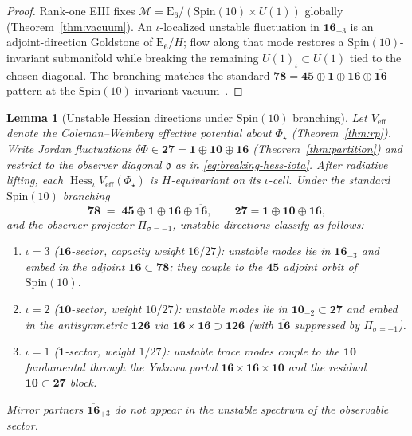 \documentclass[aps,prd,onecolumn,amsmath,amssymb,nofootinbib,11pt]{revtex4-2}
\numberwithin{equation}{section}
\theoremstyle{plain}
\newtheorem{lemma}[theorem]{Lemma}
\theoremstyle{definition}
\theoremstyle{remark}
\newcommand{\E}[1]{\mathrm{E}_{#1}}
\newcommand{\Spin}{\mathrm{Spin}}
\newcommand{\orderparam}{\Phi}
\newcommand{\Hess}{\operatorname{Hess}}
\begin{document}
\begin{proof}
Rank-one EIII fixes $\mathcal{M}=\E{6}/(\Spin(10)\times U(1))$ globally
(Theorem~\ref{thm:vacuum}). An $\iota$-localized unstable fluctuation in
$\mathbf{16}_{-3}$ is an adjoint-direction Goldstone of $\E{6}/H$; flow along
that mode restores a $\Spin(10)$-invariant submanifold while breaking the
remaining $U(1)_\iota\subset U(1)$ tied to the chosen diagonal. The branching
matches the standard
$\mathbf{78}=\mathbf{45}\oplus\mathbf{1}\oplus\mathbf{16}\oplus\overline{\mathbf{16}}$
pattern at the $\Spin(10)$-invariant vacuum~\cite{Witten1985,GeorgiGlashow1974}.
\end{proof}

\begin{lemma}[Unstable Hessian directions under $\Spin(10)$ branching]
\label{lem:breaking-hess-spin10}
Let $V_{\mathrm{eff}}$ denote the Coleman--Weinberg effective potential about
$\orderparam_\star$ (Theorem~\ref{thm:rp}). Write Jordan fluctuations
$\delta\orderparam\in\mathbf{27}=\mathbf{1}\oplus\mathbf{10}\oplus\mathbf{16}$
(Theorem~\ref{thm:partition}) and restrict to the observer diagonal
$\mathfrak{d}$ as in \eqref{eq:breaking-hess-iota}. After radiative lifting,
each $\Hess_\iota V_{\mathrm{eff}}(\orderparam_\star)$ is
$H$-equivariant on its $\iota$-cell. Under the standard $\Spin(10)$ branching
\begin{equation}\label{eq:breaking-adjoint-branch}
  \mathbf{78}
  \;=\;
  \mathbf{45}\oplus\mathbf{1}\oplus\mathbf{16}\oplus\overline{\mathbf{16}},
  \qquad
  \mathbf{27}=\mathbf{1}\oplus\mathbf{10}\oplus\mathbf{16},
\end{equation}
and the observer projector $\Pi_{\sigma=-1}$, unstable directions classify as
follows:
\begin{enumerate}[label=(\roman*),leftmargin=*]
  \item $\iota=3$ ($\mathbf{16}$-sector, capacity weight $16/27$): unstable
    modes lie in $\mathbf{16}_{-3}$ and embed in the adjoint
    $\mathbf{16}\subset\mathbf{78}$; they couple to the $\mathbf{45}$ adjoint
    orbit of $\Spin(10)$.
  \item $\iota=2$ ($\mathbf{10}$-sector, weight $10/27$): unstable modes lie in
    $\mathbf{10}_{-2}\subset\mathbf{27}$ and embed in the antisymmetric
    $\mathbf{126}$ via $\mathbf{16}\times\mathbf{16}\supset\mathbf{126}$
    (with $\overline{\mathbf{16}}$ suppressed by $\Pi_{\sigma=-1}$).
  \item $\iota=1$ ($\mathbf{1}$-sector, weight $1/27$): unstable trace modes
    couple to the $\mathbf{10}$ fundamental through the Yukawa portal
    $\mathbf{16}\times\mathbf{16}\times\mathbf{10}$ and the residual
    $\mathbf{10}\subset\mathbf{27}$ block.
\end{enumerate}
Mirror partners $\overline{\mathbf{16}}_{+3}$ do not appear in the unstable
spectrum of the observable sector.
\end{lemma}
\end{document}
